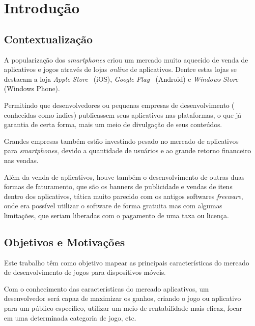 
\chapter{Introdução}
\label{cap:introducao}


\section{Contextualização}

A popularização dos \emph{smartphones} criou um mercado muito aquecido de venda de aplicativos e jogos através de lojas \emph{online} de aplicativos. Dentre estas lojas se destacam a loja \emph{Apple Store}~\cite{appstore} (iOS), \emph{Google Play}~\cite{googleplay} (Android) e \emph{Windows Store} (Windows Phone).


Permitindo que desenvolvedores ou pequenas empresas de desenvolvimento ( conhecidas como indies) publicassem seus aplicativos nas plataformas, o que já garantia de certa forma, mais um meio de divulgação de seus conteúdos.


Grandes empresas também estão investindo pesado no mercado de aplicativos para \emph{smartphones}, devido a quantidade de usuários e ao grande retorno financeiro nas vendas.



Além da venda de aplicativos, houve também o desenvolvimento de outras duas formas de faturamento, que são os banners de publicidade e vendas de itens dentro dos aplicativos, tática muito parecido com os antigos softwares \emph{freeware}, onde era possível utilizar o software de forma gratuita mas com algumas limitações, que seriam liberadas com o pagamento de uma taxa ou licença.







\section{Objetivos e Motivações}

Este trabalho têm como objetivo mapear as principais características do mercado de desenvolvimento de jogos para dispositivos móveis. 

Com o conhecimento das características do mercado aplicativos, um desenvolvedor será capaz de maximizar os ganhos, criando o jogo ou aplicativo para um público específico, utilizar um meio de rentabilidade mais eficaz, focar em uma determinada categoria de jogo, etc.
 

